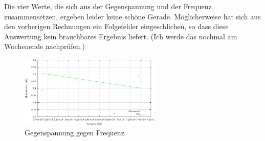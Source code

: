 Die vier Werte, die sich aus der Gegenspannung und der Frequenz zusammensetzen, ergeben leider keine schöne Gerade. Möglicherweise hat sich aus den vorherigen Rechnungen ein Folgefehler eingeschlichen, so dass diese Auswertung kein brauchbares Ergebnis liefert. (Ich werde das nochmal am Wochenende nachprüfen.)

\begin{figure}[H]
\includegraphics[width=0.6\textwidth]{pics/4werte.jpg}
\caption{Gegenspannung gegen Frequenz}
\end{figure} 





